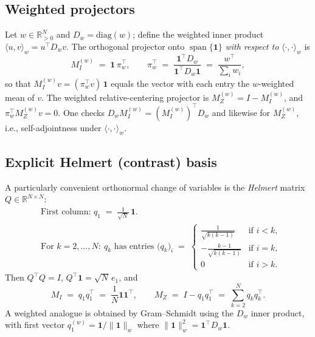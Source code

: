 \documentclass[11pt]{article}
\newcommand{\one}{\mathbf{1}}
\newcommand{\R}{\mathbb{R}}
\begin{document}
\subsection{Weighted projectors}
Let $w\in\R^N_{>0}$ and $D_w=\mathrm{diag}(w)$; define the weighted inner product $\langle u,v\rangle_w = u^\top D_w v$. The orthogonal projector onto $\operatorname{span}\{\one\}$ \emph{with respect to} $\langle\cdot,\cdot\rangle_w$ is
\begin{equation}
\label{eq:weighted-projectors}
M_I^{(w)} \;=\; \one\,\pi_w^\top,\qquad
\pi_w^\top \;=\; \frac{\one^\top D_w}{\one^\top D_w \one} \;=\; \frac{w^\top}{\sum_i w_i},
\end{equation}
so that $M_I^{(w)} v = (\pi_w^\top v)\,\one$ equals the vector with each entry the $w$-weighted mean of $v$. The weighted relative-centering projector is $M_Z^{(w)} = I - M_I^{(w)}$, and $\pi_w^\top M_Z^{(w)}v=0$. One checks $D_w M_I^{(w)}=(M_I^{(w)})^\top D_w$ and likewise for $M_Z^{(w)}$, i.e., self-adjointness under $\langle\cdot,\cdot\rangle_w$.

\subsection{Explicit Helmert (contrast) basis}
A particularly convenient orthonormal change of variables is the \emph{Helmert} matrix $Q\in\R^{N\times N}$:
\begin{align}
&\text{First column: } q_1 \;=\; \frac{1}{\sqrt N}\,\one. \label{eq:helmert-q1}\\[3pt]
&\text{For } k=2,\dots,N:\
q_k \text{ has entries } \big(q_k\big)_i \;=\;
\begin{cases}
\frac{1}{\sqrt{k(k-1)}} & \text{if } i<k,\\[3pt]
-\frac{k-1}{\sqrt{k(k-1)}} & \text{if } i=k,\\[3pt]
0 & \text{if } i>k.
\end{cases}
\label{eq:helmert-qk}
\end{align}
Then $Q^\top Q=I$, $Q^\top \one = \sqrt{N}\,e_1$, and
\begin{equation}
M_I \;=\; q_1 q_1^\top \;=\; \frac{1}{N}\one\one^\top,\qquad
M_Z \;=\; I - q_1 q_1^\top \;=\; \sum_{k=2}^N q_k q_k^\top.
\end{equation}
A weighted analogue is obtained by Gram–Schmidt using the $D_w$ inner product, with first vector $q^{(w)}_1=\one/\|\one\|_w$ where $\|\one\|_w^2=\one^\top D_w \one$.
\end{document}
